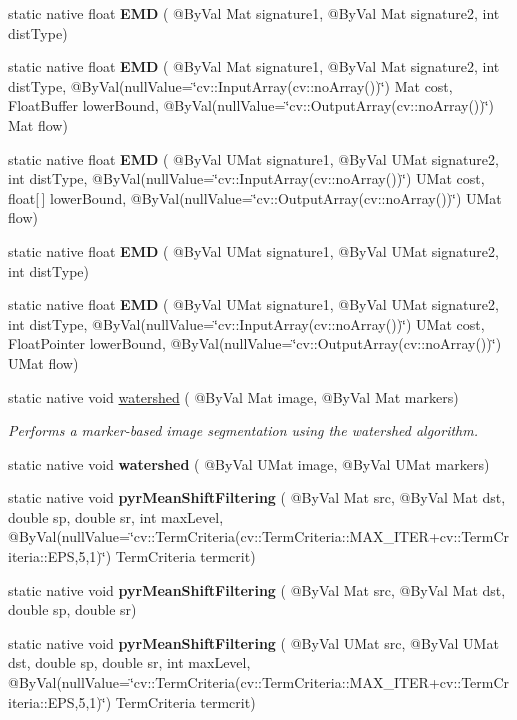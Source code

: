 \begin{DoxyCompactItemize}
static native float {\bfseries E\+MD} ( @By\+Val Mat signature1, @By\+Val Mat signature2, int dist\+Type)
\item 
static native float {\bfseries E\+MD} ( @By\+Val Mat signature1, @By\+Val Mat signature2, int dist\+Type, @By\+Val(null\+Value=\char`\"{}cv\+::\+Input\+Array(cv\+::no\+Array())\char`\"{}) Mat cost, Float\+Buffer lower\+Bound, @By\+Val(null\+Value=\char`\"{}cv\+::\+Output\+Array(cv\+::no\+Array())\char`\"{}) Mat flow)
\item 
static native float {\bfseries E\+MD} ( @By\+Val U\+Mat signature1, @By\+Val U\+Mat signature2, int dist\+Type, @By\+Val(null\+Value=\char`\"{}cv\+::\+Input\+Array(cv\+::no\+Array())\char`\"{}) U\+Mat cost, float\mbox{[}$\,$\mbox{]} lower\+Bound, @By\+Val(null\+Value=\char`\"{}cv\+::\+Output\+Array(cv\+::no\+Array())\char`\"{}) U\+Mat flow)
\item 
static native float {\bfseries E\+MD} ( @By\+Val U\+Mat signature1, @By\+Val U\+Mat signature2, int dist\+Type)
\item 
static native float {\bfseries E\+MD} ( @By\+Val U\+Mat signature1, @By\+Val U\+Mat signature2, int dist\+Type, @By\+Val(null\+Value=\char`\"{}cv\+::\+Input\+Array(cv\+::no\+Array())\char`\"{}) U\+Mat cost, Float\+Pointer lower\+Bound, @By\+Val(null\+Value=\char`\"{}cv\+::\+Output\+Array(cv\+::no\+Array())\char`\"{}) U\+Mat flow)
\item 
static native void \hyperlink{group__imgproc__misc_ga997b28508969435b04cb1bcb8ebc0841}{watershed} ( @By\+Val Mat image, @By\+Val Mat markers)
\begin{DoxyCompactList}\small\item\em Performs a marker-\/based image segmentation using the watershed algorithm. \end{DoxyCompactList}\item 
static native void {\bfseries watershed} ( @By\+Val U\+Mat image, @By\+Val U\+Mat markers)
\item 
static native void {\bfseries pyr\+Mean\+Shift\+Filtering} ( @By\+Val Mat src, @By\+Val Mat dst, double sp, double sr, int max\+Level, @By\+Val(null\+Value=\char`\"{}cv\+::\+Term\+Criteria(cv\+::\+Term\+Criteria\+::\+M\+A\+X\+\_\+\+I\+T\+ER+cv\+::\+Term\+Criteria\+::\+E\+PS,5,1)\char`\"{}) Term\+Criteria termcrit)
\item 
static native void {\bfseries pyr\+Mean\+Shift\+Filtering} ( @By\+Val Mat src, @By\+Val Mat dst, double sp, double sr)
\item 
static native void {\bfseries pyr\+Mean\+Shift\+Filtering} ( @By\+Val U\+Mat src, @By\+Val U\+Mat dst, double sp, double sr, int max\+Level, @By\+Val(null\+Value=\char`\"{}cv\+::\+Term\+Criteria(cv\+::\+Term\+Criteria\+::\+M\+A\+X\+\_\+\+I\+T\+ER+cv\+::\+Term\+Criteria\+::\+E\+PS,5,1)\char`\"{}) Term\+Criteria termcrit)

\end{DoxyCompactItemize}
